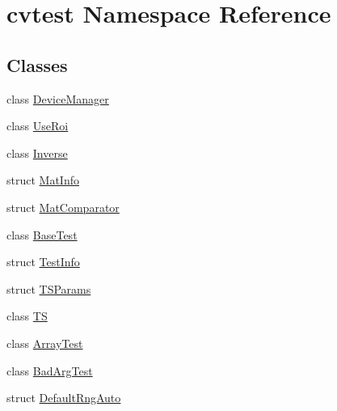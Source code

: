 \hypertarget{namespacecvtest}{\section{cvtest Namespace Reference}
\label{namespacecvtest}
}
\subsection*{Classes}
\begin{DoxyCompactItemize}
\item 
class \hyperlink{classcvtest_1_1DeviceManager}{Device\-Manager}
\item 
class \hyperlink{classcvtest_1_1UseRoi}{Use\-Roi}
\item 
class \hyperlink{classcvtest_1_1Inverse}{Inverse}
\item 
struct \hyperlink{structcvtest_1_1MatInfo}{Mat\-Info}
\item 
struct \hyperlink{structcvtest_1_1MatComparator}{Mat\-Comparator}
\item 
class \hyperlink{classcvtest_1_1BaseTest}{Base\-Test}
\item 
struct \hyperlink{structcvtest_1_1TestInfo}{Test\-Info}
\item 
struct \hyperlink{structcvtest_1_1TSParams}{T\-S\-Params}
\item 
class \hyperlink{classcvtest_1_1TS}{T\-S}
\item 
class \hyperlink{classcvtest_1_1ArrayTest}{Array\-Test}
\item 
class \hyperlink{classcvtest_1_1BadArgTest}{Bad\-Arg\-Test}
\item 
struct \hyperlink{structcvtest_1_1DefaultRngAuto}{Default\-Rng\-Auto}
\end{DoxyCompactItemize}
